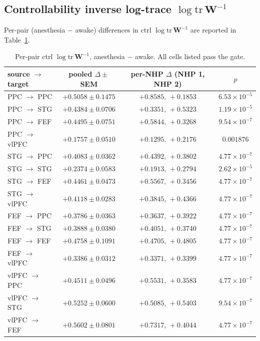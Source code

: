 \subsection*{Controllability inverse log-trace $\log\mathrm{tr}\,\mathbf{W}^{-1}$}\label{supp:interareal-control-tab-ctrl-Winv}

Per-pair (anesthesia $-$ awake) differences in ctrl $\log\mathrm{tr}\,\mathbf{W}^{-1}$ are reported in Table~\ref{tab:supp-interareal-control-ctrl-Winv}.

\begin{table}[h!]
\centering
\small
\caption[Per-pair ctrl $\log\mathrm{tr}\,\mathbf{W}^{-1}$]{Per-pair ctrl $\log\mathrm{tr}\,\mathbf{W}^{-1}$, anesthesia $-$ awake. All cells listed pass the gate.}
\label{tab:supp-interareal-control-ctrl-Winv}
\begin{tabular}{lccc}
\toprule
source $\to$ target & pooled $\Delta\pm$SEM & per-NHP $\Delta$ (NHP 1, NHP 2) & $p$ \\
\midrule
PPC $\to$ PPC   & $+0.5058\pm 0.1475$ & $+0.8585,\,+0.1853$ & $6.53\!\times\!10^{-5}$ \\
PPC $\to$ STG   & $+0.4384\pm 0.0706$ & $+0.3351,\,+0.5323$ & $1.19\!\times\!10^{-5}$ \\
PPC $\to$ FEF   & $+0.4495\pm 0.0751$ & $+0.5844,\,+0.3268$ & $9.54\!\times\!10^{-7}$ \\
PPC $\to$ vlPFC & $+0.1757\pm 0.0510$ & $+0.1295,\,+0.2176$ & $0.001876$ \\
STG $\to$ PPC   & $+0.4083\pm 0.0362$ & $+0.4392,\,+0.3802$ & $4.77\!\times\!10^{-7}$ \\
STG $\to$ STG   & $+0.2374\pm 0.0583$ & $+0.1913,\,+0.2794$ & $2.62\!\times\!10^{-5}$ \\
STG $\to$ FEF   & $+0.4461\pm 0.0473$ & $+0.5567,\,+0.3456$ & $4.77\!\times\!10^{-7}$ \\
STG $\to$ vlPFC & $+0.4118\pm 0.0283$ & $+0.3845,\,+0.4366$ & $4.77\!\times\!10^{-7}$ \\
FEF $\to$ PPC   & $+0.3786\pm 0.0363$ & $+0.3637,\,+0.3922$ & $4.77\!\times\!10^{-7}$ \\
FEF $\to$ STG   & $+0.3888\pm 0.0380$ & $+0.4051,\,+0.3740$ & $4.77\!\times\!10^{-7}$ \\
FEF $\to$ FEF   & $+0.4758\pm 0.1091$ & $+0.4705,\,+0.4805$ & $4.77\!\times\!10^{-7}$ \\
FEF $\to$ vlPFC & $+0.3386\pm 0.0312$ & $+0.3371,\,+0.3399$ & $4.77\!\times\!10^{-7}$ \\
vlPFC $\to$ PPC & $+0.4511\pm 0.0496$ & $+0.5531,\,+0.3583$ & $4.77\!\times\!10^{-7}$ \\
vlPFC $\to$ STG & $+0.5252\pm 0.0600$ & $+0.5085,\,+0.5403$ & $9.54\!\times\!10^{-7}$ \\
vlPFC $\to$ FEF & $+0.5602\pm 0.0801$ & $+0.7317,\,+0.4044$ & $4.77\!\times\!10^{-7}$ \\
\bottomrule
\end{tabular}
\end{table}

